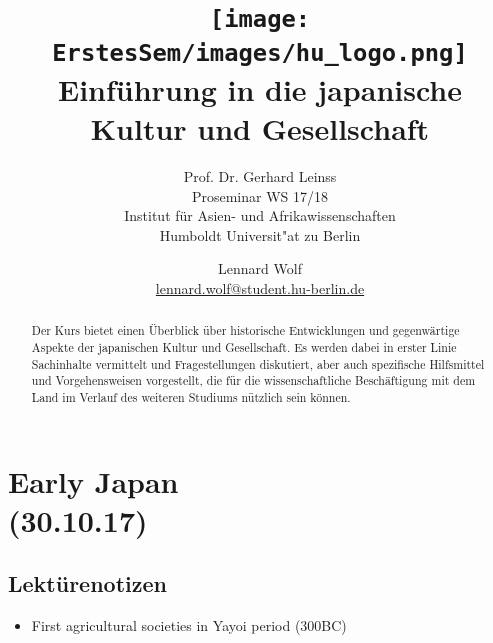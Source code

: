 \documentclass[emulatestandardclasses]{scrartcl}
\date{\vspace{-3ex}}
\begin{document}
\title{
	\texttt{[image: ErstesSem/images/hu\_logo.png]}\\
	\vspace{25pt}
	Einführung in die japanische\\Kultur und Gesellschaft}
\subtitle{\vspace{10pt}
			Prof. Dr. Gerhard Leinss\\
			Proseminar WS 17/18\\
          Institut für Asien- und Afrikawissenschaften\\ 
          Humboldt Universit"at zu Berlin}
\author{Lennard Wolf\\
        \small{\href{mailto:lennard.wolf@student.hu-berlin.de}{lennard.wolf@student.hu-berlin.de}}}
\maketitle
\begin{abstract}
Der Kurs bietet einen Überblick über historische Entwicklungen und gegenwärtige Aspekte der japanischen Kultur und Gesellschaft. Es werden dabei in erster Linie Sachinhalte vermittelt und Fragestellungen diskutiert, aber auch spezifische Hilfsmittel und Vorgehensweisen vorgestellt, die für die wissenschaftliche Beschäftigung mit dem Land im Verlauf des weiteren Studiums nützlich sein können.

\end{abstract}
\newpage

\tableofcontents
\newpage


\section{Early Japan\\(30.10.17)}

\subsection{Lektürenotizen}

\begin{itemize}
  \item First agricultural societies in Yayoi period (300BC)
\end{itemize}


\newpage
%


\end{document}
